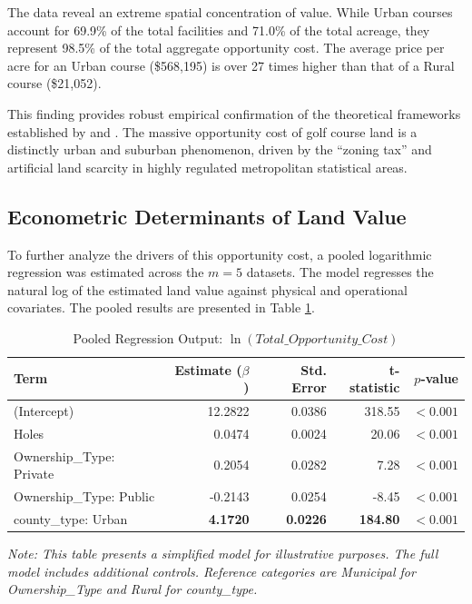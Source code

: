 \documentclass[10pt, letterpaper]{article}
\begin{document}
The data reveal an extreme spatial concentration of value. While Urban courses account for 69.9\% of the total facilities and 71.0\% of the total acreage, they represent 98.5\% of the total aggregate opportunity cost. The average price per acre for an Urban course (\$568,195) is over 27 times higher than that of a Rural course (\$21,052). 

This finding provides robust empirical confirmation of the theoretical frameworks established by \textcite{Davis2021} and \textcite{Glaeser2005}. The massive opportunity cost of golf course land is a distinctly urban and suburban phenomenon, driven by the ``zoning tax'' and artificial land scarcity in highly regulated metropolitan statistical areas.

\subsection{Econometric Determinants of Land Value}
To further analyze the drivers of this opportunity cost, a pooled logarithmic regression was estimated across the $m=5$ datasets. The model regresses the natural log of the estimated land value against physical and operational covariates. The pooled results are presented in Table \ref{tab:regression}.

\begin{table}[h!]
\centering
\caption{Pooled Regression Output: $\ln(Total\_Opportunity\_Cost)$}
\label{tab:regression}
\renewcommand{\arraystretch}{1.2}
\begin{tabular}{l r r r r}
\hline
\textbf{Term} & \textbf{Estimate ($\beta$)} & \textbf{Std. Error} & \textbf{t-statistic} & \textbf{$p$-value} \\
\hline
(Intercept) & 12.2822 & 0.0386 & 318.55 & $< 0.001$ \\
Holes & 0.0474 & 0.0024 & 20.06 & $< 0.001$ \\
Ownership\_Type: Private & 0.2054 & 0.0282 & 7.28 & $< 0.001$ \\
Ownership\_Type: Public & -0.2143 & 0.0254 & -8.45 & $< 0.001$ \\
county\_type: Urban & \textbf{4.1720} & \textbf{0.0226} & \textbf{184.80} & \textbf{$< 0.001$} \\
\hline
\end{tabular}
\justify
\footnotesize{\textit{Note: This table presents a simplified model for illustrative purposes. The full model includes additional controls. Reference categories are Municipal for Ownership\_Type and Rural for county\_type.}}
\end{table}
\end{document}
